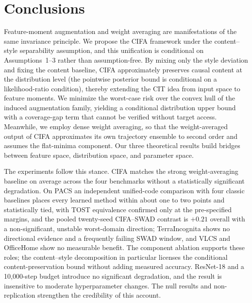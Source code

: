 \documentclass[electronics,article,submit,moreauthors]{Definitions/mdpi}
\newcommand{\add}[1]{\textcolor{addblue}{#1}}
\newcommand{\del}[1]{\textcolor{delred}{\st{#1}}}
\def\add#1{#1}
\def\del#1{}
\begin{document}
\section{Conclusions}

Feature-moment augmentation and weight averaging are manifestations of the same invariance principle. We propose the CIFA framework under the \del{content-style}\add{content--style} separability assumption, and this unification is conditional on Assumptions~1--3 rather than assumption-free. By mixing only the style deviation and fixing the content baseline, \del{CIFA approximately preserves causal content,}\add{CIFA approximately preserves causal content at the distribution level (the pointwise posterior bound is conditional on a likelihood-ratio condition),} thereby extending the CIT idea from input space to feature moments. We minimize the worst-case risk over the convex hull of the induced augmentation family, yielding a conditional distribution upper bound with a coverage-gap term that cannot be verified without target access. Meanwhile, we employ dense weight averaging, so that the weight-averaged output of CIFA approximates its own trajectory ensemble to second order and assumes the flat-minima component. Our three theoretical results build bridges between feature space, distribution space, and parameter space.

The experiments follow this stance. CIFA matches the strong weight-averaging baseline on average across the four benchmarks without a statistically significant degradation. On PACS an independent unified-code comparison with four classic baselines \del{places every learned method within about one point and statistically equivalent (TOST),}
\add{places every learned method within about one to two points and statistically tied, with TOST equivalence confirmed only at the pre-specified margins,} and the pooled twenty-seed CIFA--SWAD contrast is $+0.21$ overall with a non-significant, unstable worst-domain direction; TerraIncognita shows no directional evidence and a frequently failing SWAD window, and VLCS and OfficeHome show no measurable benefit. The component ablation supports these roles; the content--style decomposition in particular licenses the \add{conditional }content-preservation bound without adding measured accuracy. ResNet-18 and a 10{,}000-step budget introduce no significant degradation, and the result is insensitive to moderate hyperparameter changes. The null results and non-replication strengthen the credibility of this account.
\end{document}
